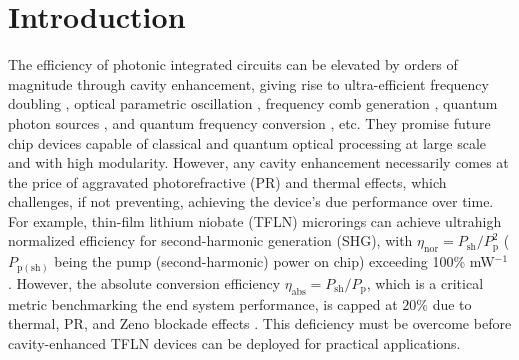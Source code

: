 \documentclass{WileyMSP-template}
\begin{document}
\section{Introduction}
The efficiency of photonic integrated circuits can be elevated by orders of magnitude through cavity enhancement, giving rise to ultra-efficient frequency doubling \cite{chen2019ultra, lu2019periodically, lu2020toward},  optical parametric oscillation \cite{lu2019milliwatt, bruch2019chip, lu2021ultralow}, frequency comb generation \cite{wang2019monolithic, he2019self, bruch2021pockels}, quantum photon sources \cite{lu2019chip, ma2020ultrabright}, and quantum frequency conversion \cite{singh2019quantum}, etc. They promise future chip devices capable of classical and quantum optical processing at large scale and with high modularity. However, any cavity enhancement necessarily comes at the price of aggravated photorefractive (PR) and thermal effects, which challenges, if not preventing, achieving the device's due performance over time. For example, thin-film lithium niobate (TFLN) microrings can achieve ultrahigh normalized efficiency for second-harmonic generation (SHG), with $\eta_\mathrm{nor} = P_\mathrm{sh}/P^2_\mathrm{p}$ ($P_\mathrm{p(sh)}$ being the pump (second-harmonic) power on chip) exceeding 100$\%$ mW$^{-1}$ \cite{chen2019ultra, lu2019periodically, lu2020toward, ma2020ultrabright}. However, the absolute conversion efficiency $\eta_\mathrm{abs} = P_\mathrm{sh}/P_\mathrm{p}$, which is a critical metric benchmarking the end system performance, is capped at $20\%$ due to thermal, PR, and Zeno blockade effects \cite{Huang:13, chen2017observation}. This deficiency must be overcome before cavity-enhanced TFLN devices can be deployed for practical applications. 


\end{document}
